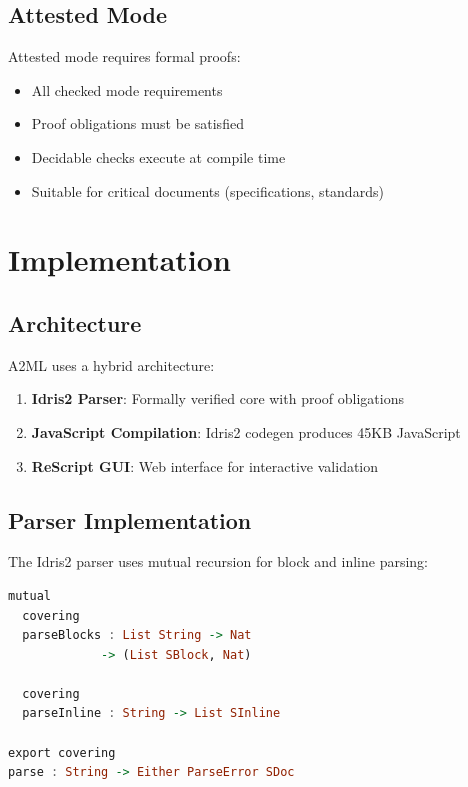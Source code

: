 \documentclass[10pt,twocolumn]{article}
\begin{document}
\subsection{Attested Mode}

Attested mode requires formal proofs:
\begin{itemize}
  \item All checked mode requirements
  \item Proof obligations must be satisfied
  \item Decidable checks execute at compile time
  \item Suitable for critical documents (specifications, standards)
\end{itemize}

\section{Implementation}
\label{sec:implementation}

\subsection{Architecture}

A2ML uses a hybrid architecture:

\begin{enumerate}
  \item \textbf{Idris2 Parser}: Formally verified core with proof obligations
  \item \textbf{JavaScript Compilation}: Idris2 codegen produces 45KB JavaScript
  \item \textbf{ReScript GUI}: Web interface for interactive validation
\end{enumerate}

\subsection{Parser Implementation}

The Idris2 parser uses mutual recursion for block and inline parsing:

\begin{lstlisting}[language=Haskell]
mutual
  covering
  parseBlocks : List String -> Nat
             -> (List SBlock, Nat)

  covering
  parseInline : String -> List SInline

export covering
parse : String -> Either ParseError SDoc
\end{lstlisting}
\end{document}
